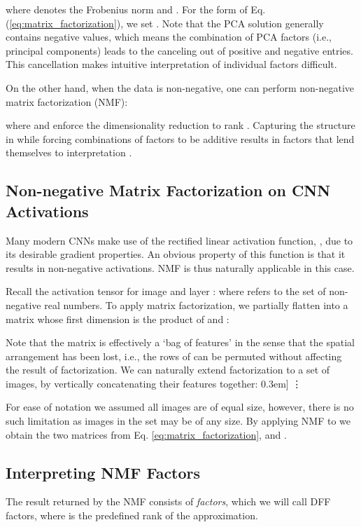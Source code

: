 \documentclass[runningheads]{llncs}
\begin{document}
	where  denotes the Frobenius norm and . For the form of Eq. (\ref{eq:matrix_factorization}), we set . Note that the PCA solution generally contains negative values, which means the  combination of PCA factors (i.e., principal components) leads to the canceling out of positive and negative entries. This cancellation makes intuitive interpretation of individual factors difficult.
	
	On the other hand, when the data  is non-negative, one can perform non-negative matrix factorization (NMF):
	
	where  and  enforce the dimensionality reduction to rank . Capturing the structure in  while forcing combinations of factors to be additive results in factors that lend themselves to interpretation \cite{lee1999learning}.
	
	
	\subsection{Non-negative Matrix Factorization on CNN Activations} \label{sec: NMF on CNN Activations}
	Many modern CNNs make use of the rectified linear activation function, , due to its desirable gradient properties. An obvious property of this function is that it results in non-negative activations. NMF is thus naturally applicable in this case.
	
	Recall the activation tensor for image  and layer :
	where  refers to the set of non-negative real numbers. To apply matrix factorization, we partially flatten  into a matrix whose first dimension is the product of  and :
	
	
	Note that the matrix  is effectively a `bag of features' in the sense that the spatial arrangement has been lost, i.e., the rows of  can be permuted without affecting the result of factorization. We can naturally extend factorization to a set of  images, by vertically concatenating their features together:
	0.3em]
	\vdots \
	
    For ease of notation we assumed all images are of equal size, however, there is no such limitation as images in the set may be of any size.
	By applying NMF to  we obtain the two matrices from Eq. \ref{eq:matrix_factorization},  and .
	
	\subsection{Interpreting NMF Factors} \label{sec:Interpreting NMF Factors}
	
	The result returned by the NMF consists of  \emph{factors}, which we will call DFF factors, where  is the predefined rank of the approximation. 
\end{document}
